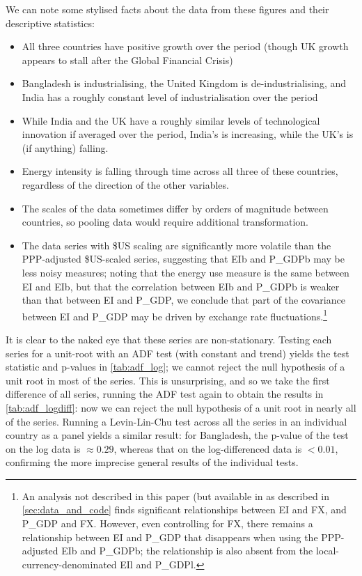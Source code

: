 \documentclass[11pt,a4paper]{article}
\begin{document}
We can note some stylised facts about the data from these figures and their descriptive statistics:
\begin{itemize}

\item All three countries have positive growth over the period (though UK growth appears to stall  after the Global Financial Crisis)
\item Bangladesh is industrialising, the United Kingdom is de-industrialising, and India has a roughly constant level of industrialisation over the period
\item While India and the UK have a roughly similar levels of technological innovation if averaged over the period, India's is increasing, while the UK's is (if anything) falling.
\item Energy intensity is falling through time across all three of these countries, regardless of the direction of the other variables.
\item The scales of the data sometimes differ by orders of magnitude between countries, so pooling data would require additional transformation.
\item The data series with \$US scaling are significantly more volatile than the PPP-adjusted \$US-scaled series, suggesting that EIb and P\_GDPb may be less noisy measures; noting that the energy use measure is the same between EI and EIb, but that the correlation between EIb and P\_GDPb is weaker than that between EI and P\_GDP, we conclude that part of the covariance between EI and P\_GDP may be driven by exchange rate fluctuations.\footnote{
An analysis not described in this paper (but available in as described in \cref{sec:data_and_code} finds significant relationships between EI and FX, and P\_GDP and FX.
However, even controlling for FX, there remains a relationship between EI and P\_GDP that disappears when using the PPP-adjusted EIb and P\_GDPb; the relationship is also absent from the local-currency-denominated EIl and P\_GDPl.
}
\end{itemize}
It is clear to the naked eye that these series are non-stationary.
Testing each series for a unit-root with an ADF test (with constant and trend) yields the test statistic and p-values in \cref{tab:adf_log}; we cannot reject the null hypothesis of a unit root in most of the series.
This is unsurprising, and so we take the first difference of all series, running the ADF test again to obtain the results in \cref{tab:adf_logdiff}: now we can reject the null hypothesis of a unit root in nearly all of the series.
Running a Levin-Lin-Chu test across all the series in an individual country as a panel yields a similar result: for Bangladesh, the p-value of the test on the log data is $\approx0.29$, whereas that on the log-differenced data is $<0.01$, confirming the more imprecise general results of the individual tests.
\end{document}
